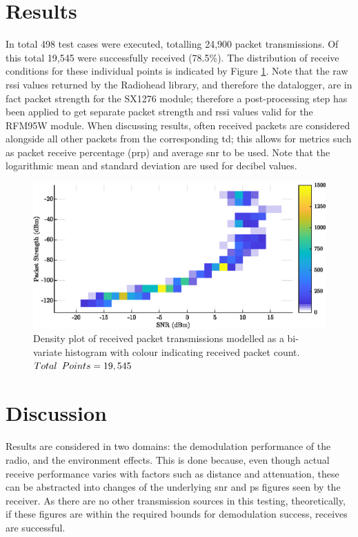 \section{Results}
In total 498 test cases were executed, totalling 24,900 packet transmissions. Of this total 19,545 were successfully received (78.5\%). The distribution of receive conditions for these individual points is indicated by Figure \ref{fig:density_plot}. Note that the raw \ac{rssi} values returned by the Radiohead library, and therefore the datalogger, are in fact packet strength for the SX1276 module; therefore a post-processing step has been applied to get separate packet strength and \ac{rssi} values valid for the RFM95W module. When discussing results, often received packets are considered alongside all other packets from the corresponding \ac{td}; this allows for metrics such as packet receive percentage (\ac{prp}) and average \ac{snr} to be used. Note that the logarithmic mean and standard deviation are used for decibel values.

\begin{figure}[H]
    \centering
   	\includegraphics{Figures/density_plot}
    \caption[Test data distribution plot]{
    Density plot of received packet transmissions modelled as a bi-variate histogram with colour indicating received packet count. \\$Total\enskip Points = 19,545$
    }
    \label{fig:density_plot}
\end{figure}

\section{Discussion}
Results are considered in two domains: the demodulation performance of the radio, and the environment effects. This is done because, even though actual receive performance varies with factors such as distance and attenuation, these can be abstracted into changes of the underlying \ac{snr} and \ac{ps} figures seen by the receiver. As there are no other transmission sources in this testing, theoretically, if these figures are within the required bounds for demodulation success, receives are successful.

